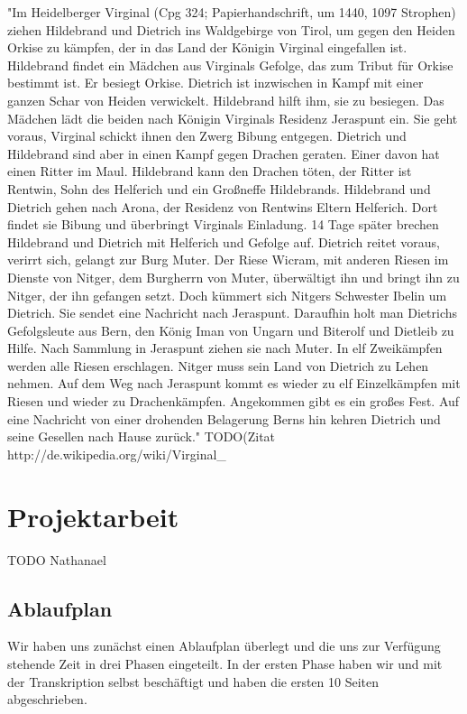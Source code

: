 \documentclass[a4paper, 12pt, oneside]{scrbook}
\begin{document}
"Im Heidelberger Virginal (Cpg 324; Papierhandschrift, um 1440, 1097 Strophen) ziehen Hildebrand und Dietrich ins Waldgebirge von Tirol, um gegen den Heiden Orkise zu kämpfen, der in das Land der Königin Virginal eingefallen ist. Hildebrand findet ein Mädchen aus Virginals Gefolge, das zum Tribut für Orkise bestimmt ist. Er besiegt Orkise. Dietrich ist inzwischen in Kampf mit einer ganzen Schar von Heiden verwickelt. Hildebrand hilft ihm, sie zu besiegen. Das Mädchen lädt die beiden nach Königin Virginals Residenz Jeraspunt ein. Sie geht voraus, Virginal schickt ihnen den Zwerg Bibung entgegen. Dietrich und Hildebrand sind aber in einen Kampf gegen Drachen geraten. Einer davon hat einen Ritter im Maul. Hildebrand kann den Drachen töten, der Ritter ist Rentwin, Sohn des Helferich und ein Großneffe Hildebrands. Hildebrand und Dietrich gehen nach Arona, der Residenz von Rentwins Eltern Helferich. Dort findet sie Bibung und überbringt Virginals Einladung. 14 Tage später brechen Hildebrand und Dietrich mit Helferich und Gefolge auf. Dietrich reitet voraus, verirrt sich, gelangt zur Burg Muter. Der Riese Wicram, mit anderen Riesen im Dienste von Nitger, dem Burgherrn von Muter, überwältigt ihn und bringt ihn zu Nitger, der ihn gefangen setzt. Doch kümmert sich Nitgers Schwester Ibelin um Dietrich. Sie sendet eine Nachricht nach Jeraspunt. Daraufhin holt man Dietrichs Gefolgsleute aus Bern, den König Iman von Ungarn und Biterolf und Dietleib zu Hilfe. Nach Sammlung in Jeraspunt ziehen sie nach Muter. In elf Zweikämpfen werden alle Riesen erschlagen. Nitger muss sein Land von Dietrich zu Lehen nehmen. Auf dem Weg nach Jeraspunt kommt es wieder zu elf Einzelkämpfen mit Riesen und wieder zu Drachenkämpfen. Angekommen gibt es ein großes Fest. Auf eine Nachricht von einer drohenden Belagerung Berns hin kehren Dietrich und seine Gesellen nach Hause zurück." TODO(Zitat http://de.wikipedia.org/wiki/Virginal_%

\chapter{Projektarbeit}
TODO Nathanael
\section{Ablaufplan}
Wir haben uns zunächst einen Ablaufplan überlegt und die uns zur Verfügung stehende Zeit in drei Phasen eingeteilt. In der ersten Phase haben wir und mit der Transkription selbst beschäftigt und haben die ersten 10 Seiten abgeschrieben.
\end{document}
